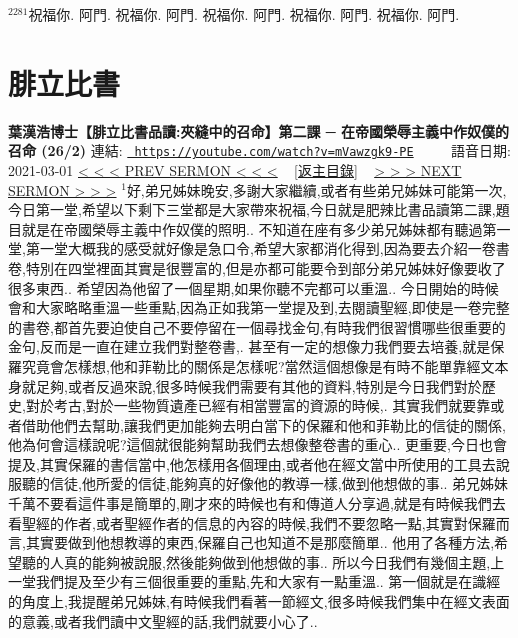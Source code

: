 \documentclass{book}
\begin{document}
$^{2281}$祝福你.
阿門.
祝福你.
阿門.
祝福你.
阿門.
祝福你.
阿門.
祝福你.
阿門.
\newpage



\section{腓立比書}
\label{sec:mVawzgk9_PE}
\textbf{葉漢浩博士【腓立比書品讀:夾縫中的召命】第二課 ─ 在帝國榮辱主義中作奴僕的召命 (26/2)}
\newline
\newline
連結: \href{https://youtube.com/watch?v=mVawzgk9-PE}{\texttt{ https://youtube.com/watch?v=mVawzgk9-PE}} ~~~~ 語音日期: 2021-03-01 
\newline
\newline
\hyperref[sec:Y_0nqRPjKNA]{\small{< < < PREV SERMON < < <}}
~
\hyperref[sec:index]{\small{[返主目錄]}}
~
\hyperref[sec:LLLLLQ816Zs]{\small{> > > NEXT SERMON > > >}}
\newline
\newline
$^{1}$好,弟兄姊妹晚安,多謝大家繼續,或者有些弟兄姊妹可能第一次,今日第一堂,希望以下剩下三堂都是大家帶來祝福,今日就是肥辣比書品讀第二課,題目就是在帝國榮辱主義中作奴僕的照明..
不知道在座有多少弟兄姊妹都有聽過第一堂,第一堂大概我的感受就好像是急口令,希望大家都消化得到,因為要去介紹一卷書卷,特別在四堂裡面其實是很豐富的,但是亦都可能要令到部分弟兄姊妹好像要收了很多東西..
希望因為他留了一個星期,如果你聽不完都可以重溫..
今日開始的時候會和大家略略重溫一些重點,因為正如我第一堂提及到,去閱讀聖經,即使是一卷完整的書卷,都首先要迫使自己不要停留在一個尋找金句,有時我們很習慣哪些很重要的金句,反而是一直在建立我們對整卷書,.
甚至有一定的想像力我們要去培養,就是保羅究竟會怎樣想,他和菲勒比的關係是怎樣呢?當然這個想像是有時不能單靠經文本身就足夠,或者反過來說,很多時候我們需要有其他的資料,特別是今日我們對於歷史,對於考古,對於一些物質遺產已經有相當豐富的資源的時候,.
其實我們就要靠或者借助他們去幫助,讓我們更加能夠去明白當下的保羅和他和菲勒比的信徒的關係,他為何會這樣說呢?這個就很能夠幫助我們去想像整卷書的重心..
更重要,今日也會提及,其實保羅的書信當中,他怎樣用各個理由,或者他在經文當中所使用的工具去說服聽的信徒,他所愛的信徒,能夠真的好像他的教導一樣,做到他想做的事..
弟兄姊妹千萬不要看這件事是簡單的,剛才來的時候也有和傳道人分享過,就是有時候我們去看聖經的作者,或者聖經作者的信息的內容的時候,我們不要忽略一點,其實對保羅而言,其實要做到他想教導的東西,保羅自己也知道不是那麼簡單..
他用了各種方法,希望聽的人真的能夠被說服,然後能夠做到他想做的事..
所以今日我們有幾個主題,上一堂我們提及至少有三個很重要的重點,先和大家有一點重溫..
第一個就是在識經的角度上,我提醒弟兄姊妹,有時候我們看著一節經文,很多時候我們集中在經文表面的意義,或者我們讀中文聖經的話,我們就要小心了..
\end{document}
